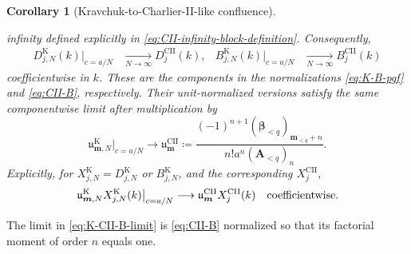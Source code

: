 \documentclass[10pt]{amsart}
\newcommand{\A}{\boldsymbol A}
\newcommand{\bbeta}{\boldsymbol\beta}
\newcommand{\mm}{\boldsymbol m}
\theoremstyle{plain}
\newtheorem{corollary}[theorem]{Corollary}
\theoremstyle{definition}
\theoremstyle{remark}
\begin{document}
\begin{corollary}[Kravchuk-to-Charlier-II-like confluence]
\begin{enumerate}[label=\textup{(\roman*)}]
infinity defined explicitly in
\eqref{eq:CII-infinity-block-definition}.
Consequently,
\begin{align}
 D_{j,N}^{\mathrm K}(k)\big|_{c=a/N}
 &\xrightarrow[N\to\infty]{}D_j^{\mathrm{CII}}(k),
 &
 B_{j,N}^{\mathrm K}(k)\big|_{c=a/N}
 &\xrightarrow[N\to\infty]{}B_j^{\mathrm{CII}}(k)
 \label{eq:K-CII-component-limit}
\end{align}
coefficientwise in \(k\).  These are the components in the
normalizations \eqref{eq:K-B-pgf} and \eqref{eq:CII-B}, respectively.
Their unit-normalized versions satisfy the same componentwise limit after
multiplication by
\begin{equation}
 \mathfrak u_{\mm,N}^{\mathrm K}\big|_{c=a/N}
 \longrightarrow
 \mathfrak u_{\mm}^{\mathrm{CII}}
 \coloneq
 \frac{(-1)^{n+1}(\bbeta_{<q})_{\mm_{<q}+n}}
 {n!a^n(\A_{<q})_n}.
 \label{eq:K-CII-unit-factor-limit}
\end{equation}
Explicitly, for \(X_{j,N}^{\mathrm K}=D_{j,N}^{\mathrm K}\) or
\(B_{j,N}^{\mathrm K}\), and the corresponding
\(X_j^{\mathrm{CII}}\),
\begin{equation}
 \left.\mathfrak u_{\mm,N}^{\mathrm K}
 X_{j,N}^{\mathrm K}(k)\right|_{c=a/N}
 \longrightarrow
 \mathfrak u_{\mm}^{\mathrm{CII}}X_j^{\mathrm{CII}}(k)
 \quad\hbox{coefficientwise}.
 \label{eq:K-CII-unit-component-limit}
\end{equation}
\end{enumerate}
\end{corollary}

The limit in \eqref{eq:K-CII-B-limit} is \eqref{eq:CII-B} normalized so
that its factorial moment of order \(n\) equals one.
\end{document}
